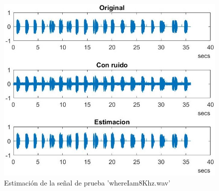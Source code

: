 \begin{figure}[H] %
\centering
\includegraphics[scale=0.7]{../EJ2/EJ2.jpg}
\caption{Estimación de la señal de prueba 'whereIam8Khz.wav'}
\label{EstimacionWhereIam}
\end{figure}




